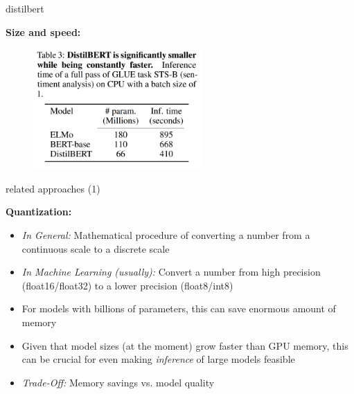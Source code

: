 
\begin{frame}{distilbert}

\vfill

\textbf{Size and speed:}

	\begin{figure}
		\centering
		\includegraphics[width = 6.5cm]{figure/53-distilbert-size-speed.png}\\ 
	\end{figure}

\vfill
	
\end{frame}


\begin{frame}{related approaches (1)}

\vfill

\textbf{Quantization:}

\begin{itemize}
	\item \textit{In General:} Mathematical procedure of converting a number from a continuous scale to a discrete scale
	\item \textit{In Machine Learning (usually):} Convert a number from high precision (float16/float32) to a lower precision (float8/int8) 
	\item For models with billions of parameters, this can save enormous amount of memory
	\item Given that model sizes (at the moment) grow faster than GPU memory, this can be crucial for even making \textit{inference} of large models feasible
	\item \textit{Trade-Off:} Memory savings vs. model quality
\end{itemize}

\vfill
	
\end{frame}

